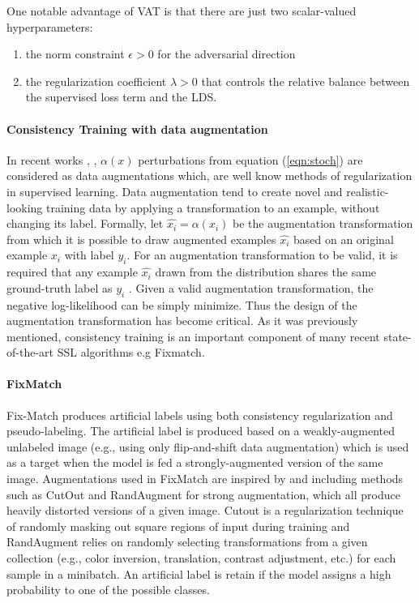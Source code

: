 \documentclass[12pt]{article}
\theoremstyle{definition}
\DeclareRobustCommand{\[}{\begin{equation}}
\DeclareRobustCommand{\]}{\end{equation}}
\begin{document}
        One notable advantage of VAT is that there are just two scalar-valued hyperparameters:
        \begin{enumerate}
            \item the norm constraint $\epsilon > 0$ for the adversarial direction
            \item the regularization coefficient $\lambda > 0$ that controls the relative balance between the supervised loss term and the LDS. 
        \end{enumerate}
    	
    	\paragraph{Consistency Training with data augmentation}
    	In recent works \cite{UDA}, \cite{MixMatch}, \cite{ReMixMatch} $\alpha(x)$ perturbations from equation (\ref{eqn:stoch})  are considered as data augmentations which, are well know methods of regularization in supervised learning. Data augmentation tend to create novel and realistic-looking training data by applying a transformation
        to an example, without changing its label. Formally, let $\hat{x_i} = \alpha(x_i)$  be the augmentation
        transformation from which it is possible to draw augmented examples $\hat{x_i}$ based on an original example $x_i$ with label $y_i$.
        For an augmentation transformation to be valid, it is required that any example $\hat{x_i}$  drawn
        from the distribution shares the same ground-truth label as $y_i$ . Given a valid augmentation transformation,
        the negative log-likelihood can be simply minimize. Thus the design of the
        augmentation transformation has become critical.
        As it was previously mentioned, consistency training is an important component of
        many recent state-of-the-art SSL algorithms e.g Fixmatch.  
    	   
	    \paragraph{FixMatch}
        Fix-Match produces artificial labels using both consistency
        regularization and pseudo-labeling. The artificial label is produced based on a weakly-augmented unlabeled
        image (e.g., using only flip-and-shift data augmentation) which is used as a target when the model is fed a
        strongly-augmented version of the same image. Augmentations used in FixMatch are inspired by \cite{UDA} and \cite{ReMixMatch} including methods such as CutOut \cite{Cutout} and RandAugment \cite{RandAugment} for strong augmentation, which all produce heavily distorted versions of a given image. Cutout is a regularization technique of randomly masking out square regions of input during training and RandAugment relies on randomly selecting transformations from a given collection (e.g., color inversion, translation, contrast adjustment, etc.) for each sample in a minibatch. An artificial label is retain if the model assigns a high probability to one of the possible classes.
        
\end{document}
